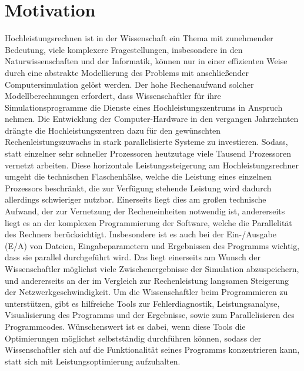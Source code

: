 \documentclass[
	12pt,
	a4paper,
	BCOR10mm,
	DIV14,
	listof=totoc,
	bibliography=totoc,
	headsepline
]{scrreprt}
\begin{document}
\section{Motivation}

Hochleistungsrechnen ist in der Wissenschaft ein Thema mit zunehmender Bedeutung, viele komplexere Fragestellungen, insbesondere in den Naturwissenschaften und der Informatik, können nur in einer effizienten Weise durch eine abstrakte Modellierung des Problems mit anschließender Computersimulation gelöst werden. Der hohe Rechenaufwand solcher Modellberechnungen erfordert, dass Wissenschaftler für ihre Simulationsprogramme die Dienste eines Hochleistungszentrums in Anspruch nehmen. 
Die Entwicklung der Computer-Hardware in den vergangen Jahrzehnten drängte die Hochleistungszentren dazu für den gewünschten Rechenleistungszuwachs in stark parallelisierte Systeme zu investieren. Sodass, statt einzelner sehr schneller Prozessoren heutzutage viele Tausend Prozessoren vernetzt arbeiten. Diese horizontale Leistungssteigerung am Hochleistungsrechner umgeht die technischen Flaschenhälse, welche die Leistung eines einzelnen Prozessors beschränkt, die zur Verfügung stehende Leistung wird dadurch allerdings schwieriger nutzbar. 
Einerseits liegt dies am großen  technische Aufwand, der zur Vernetzung der Recheneinheiten notwendig ist, andererseits liegt es an der komplexen Programmierung der Software, welche die Parallelität des Rechners berücksichtigt. Insbesondere ist es auch bei der Ein-/Ausgabe (E/A) von Dateien, Eingabeparametern und Ergebnissen des Programms wichtig, dass sie parallel durchgeführt wird. Das liegt einerseits am Wunsch der Wissenschaftler möglichst viele Zwischenergebnisse der Simulation abzuspeichern, und andererseits an der im Vergleich zur Rechenleistung langsamen Steigerung der Netzwerkgeschwindigkeit.
Um die Wissenschaftler beim Programmieren zu unterstützen, gibt es hilfreiche Tools zur Fehlerdiagnostik, Leistungsanalyse, Visualisierung des Programms und der Ergebnisse, sowie zum Parallelisieren des Programmcodes. Wünschenswert ist es dabei, wenn diese Tools die Optimierungen möglichst selbstständig durchführen können, sodass der Wissenschaftler sich auf die Funktionalität seines Programms konzentrieren kann, statt sich mit Leistungsoptimierung aufzuhalten.
\end{document}
